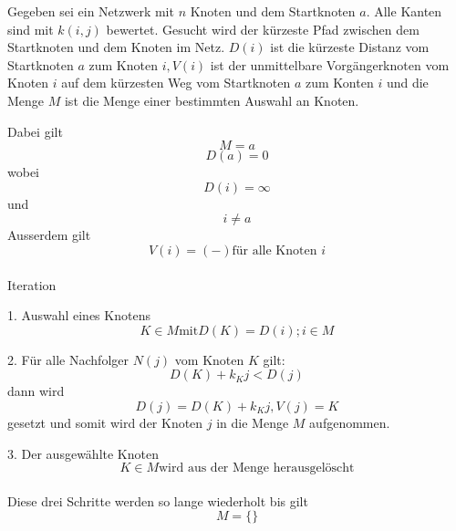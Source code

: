 Gegeben sei ein Netzwerk mit $n$ Knoten und dem Startknoten $a$.
Alle Kanten sind mit $k(i, j)$ bewertet.
Gesucht wird der kürzeste Pfad zwischen dem Startknoten und dem Knoten im Netz.
$D(i)$ ist die kürzeste Distanz vom Startknoten $a$ zum Knoten $i, V(i)$ ist der unmittelbare Vorgängerknoten vom Knoten $i$ auf dem kürzesten Weg vom Startknoten $a$ zum Konten $i$ und die Menge $M$ ist die Menge einer bestimmten Auswahl an Knoten.

Dabei gilt
\begin{equation}M={a}\end{equation}
\begin{equation}D(a)=0\end{equation} wobei
\begin{equation}D(i)=\infty\end{equation} und
\begin{equation}i \neq a \end{equation}
Ausserdem gilt \begin{equation}V(i)=(-) \text{für alle Knoten $i$}\end{equation}\\

Iteration

1. Auswahl eines Knotens \begin{equation} K\in M \text{mit} D(K)=D(i);i\in M\end{equation}

2. Für alle Nachfolger $N(j)$ vom Knoten $K$ gilt:
\begin{equation}D(K) + k_Kj < D(j)\end{equation} dann wird \begin{equation}D(j) = D(K) + k_Kj, V(j) = K\end{equation} gesetzt und somit wird der Knoten $j$ in die Menge $M$ aufgenommen.

3. Der ausgewählte Knoten \begin{equation}K\in M\text{wird aus der Menge herausgelöscht}\end{equation}\\
Diese drei Schritte werden so lange wiederholt bis gilt
\begin{equation}M=\{\}\end{equation}

